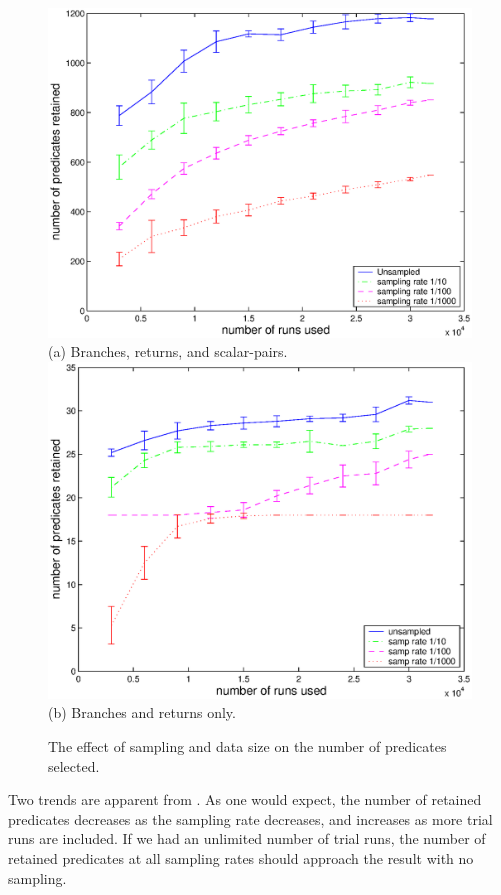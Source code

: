 \begin{figure}
\centering
\includegraphics[width=\columnwidth]{predkept3a}
(a) Branches, returns, and scalar-pairs. \\
\includegraphics[width=\columnwidth]{predkept3b}
(b) Branches and returns only.
\caption{The effect of sampling and data size on the number of
  predicates selected.}
\label{fig:predkept}
\end{figure}

Two trends are apparent from .  As one would expect,
the number of retained predicates decreases as the sampling rate decreases,
and increases as more trial runs are included.  If we had an unlimited number
of trial runs, the number of retained predicates at all sampling rates should
approach the result with no sampling.  

